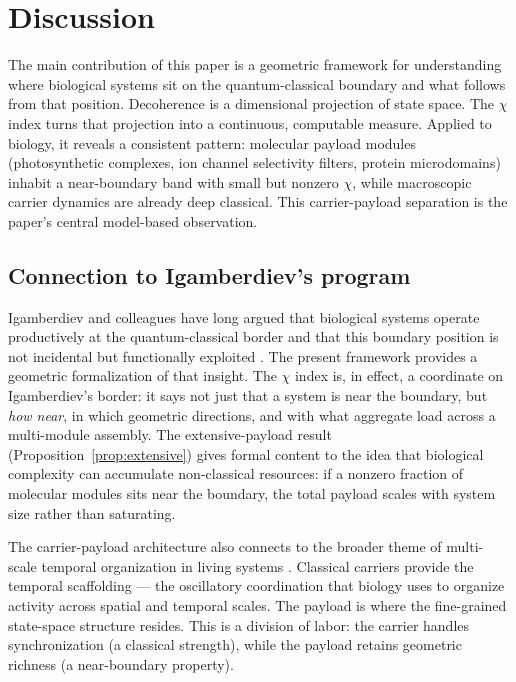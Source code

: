 \documentclass[11pt,a4paper]{article}
\theoremstyle{definition}
\theoremstyle{remark}
\begin{document}
\section{Discussion}
\label{sec:discussion}

The main contribution of this paper is a geometric framework for understanding where biological systems sit on the quantum-classical boundary and what follows from that position. Decoherence is a dimensional projection of state space. The $\chi$ index turns that projection into a continuous, computable measure. Applied to biology, it reveals a consistent pattern: molecular payload modules (photosynthetic complexes, ion channel selectivity filters, protein microdomains) inhabit a near-boundary band with small but nonzero $\chi$, while macroscopic carrier dynamics are already deep classical. This carrier-payload separation is the paper's central model-based observation.

\subsection{Connection to Igamberdiev's program}

Igamberdiev and colleagues have long argued that biological systems operate productively at the quantum-classical border and that this boundary position is not incidental but functionally exploited \cite{igamberdiev1993,igamberdiev2021qcborder}. The present framework provides a geometric formalization of that insight. The $\chi$ index is, in effect, a coordinate on Igamberdiev's border: it says not just that a system is near the boundary, but \emph{how near}, in which geometric directions, and with what aggregate load across a multi-module assembly. The extensive-payload result (Proposition~\ref{prop:extensive}) gives formal content to the idea that biological complexity can accumulate non-classical resources: if a nonzero fraction of molecular modules sits near the boundary, the total payload scales with system size rather than saturating.

The carrier-payload architecture also connects to the broader theme of multi-scale temporal organization in living systems \cite{igamberdiev2014}. Classical carriers provide the temporal scaffolding --- the oscillatory coordination that biology uses to organize activity across spatial and temporal scales. The payload is where the fine-grained state-space structure resides. This is a division of labor: the carrier handles synchronization (a classical strength), while the payload retains geometric richness (a near-boundary property).
\end{document}
